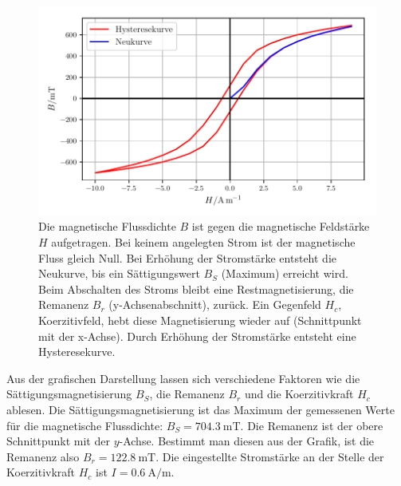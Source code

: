 \begin{figure}
    \centering
    \includegraphics{build/plotc.pdf}
    \caption{Die magnetische Flussdichte $B$ ist gegen die magnetische Feldstärke $H$
    aufgetragen. Bei keinem angelegten Strom ist der magnetische Fluss
    gleich Null. Bei Erhöhung der Stromstärke entsteht die Neukurve, bis
    ein Sättigungswert $B_{S}$ (Maximum) erreicht wird. Beim Abschalten des Stroms
    bleibt eine Restmagnetisierung, die Remanenz $B_{r}$ (y-Achsenabschnitt),
    zurück. Ein Gegenfeld $H_{c}$, Koerzitivfeld, hebt diese Magnetisierung wieder
    auf (Schnittpunkt mit der x-Achse). Durch Erhöhung der Stromstärke entsteht
    eine Hysteresekurve.}
    \label{plotc}
\end{figure}

\noindent Aus der grafischen Darstellung lassen sich verschiedene Faktoren
wie die Sättigungsmagnetisierung $B_{S}$, die Remanenz $B_{r}$ und die
Koerzitivkraft $H_{c}$ ablesen.
Die Sättigungsmagnetisierung ist das Maximum der gemessenen Werte für
die magnetische Flussdichte: $B_{S} = \SI{704.3}{\milli\tesla}$.
Die Remanenz ist der obere Schnittpunkt mit der $y$-Achse.
Bestimmt man diesen aus der Grafik, ist die Remanenz also
$B_{r} = \SI{122.8}{\milli\tesla}$.
Die eingestellte Stromstärke an der Stelle der Koerzitivkraft $H_{c}$ ist
$I = \SI{0.6}{\ampere\per\meter}$.

